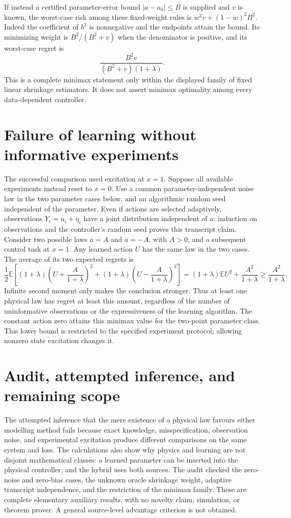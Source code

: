 \documentclass[11pt]{article}
\begin{document}
If instead a certified parameter-error bound $|a-a_0|\le B$
is supplied and $v$ is known, the worst-case risk among these
fixed-weight rules is
$w^2v+(1-w)^2B^2$. Indeed the coefficient of $b^2$ is
nonnegative and the endpoints attain the bound. Its minimizing
weight is $B^2/(B^2+v)$ when the denominator is positive,
and its worst-case regret is
\[
 \frac{B^2v}{(B^2+v)(1+\lambda)}.
\]
This is a complete minimax statement only within the displayed
family of fixed linear shrinkage estimators. It does not assert
minimax optimality among every data-dependent controller.

\section{Failure of learning without informative experiments}
The successful comparison used excitation at $x=1$. Suppose
all available experiments instead reset to $x=0$. Use a common
parameter-independent noise law in the two parameter cases below,
and an algorithmic random seed independent of the parameter.
Even if actions are selected adaptively, observations $Y_i=u_i+\eta_i$ have a
joint distribution independent of $a$: induction on observations
and the controller's random seed proves this transcript claim.
Consider two possible laws $a=A$ and $a=-A$, with $A>0$, and a
subsequent control task at $x=1$. Any learned action $U$ has the
same law in the two cases. The average of its two expected
regrets is
\[
 \frac12\mathbb E\left[(1+\lambda)
 \left(U+\frac{A}{1+\lambda}\right)^2
 +(1+\lambda)\left(U-\frac{A}{1+\lambda}\right)^2\right]
 =(1+\lambda)\mathbb E U^2+\frac{A^2}{1+\lambda}
 \ge\frac{A^2}{1+\lambda}.
\]
Infinite second moment only makes the conclusion stronger.
Thus at least one physical law has regret at least this amount,
regardless of the number of uninformative observations or the
expressiveness of the learning algorithm. The constant action
zero attains this minimax value for the two-point parameter class.
This lower bound is restricted to the specified experiment
protocol; allowing nonzero state excitation changes it.

\section{Audit, attempted inference, and remaining scope}
The attempted inference that the mere existence of a physical law
favours either modelling method fails because exact knowledge,
misspecification, observation noise, and experimental excitation
produce different comparisons on the same system and loss.
The calculations also show why physics and learning are not
disjoint mathematical classes: a learned parameter can be inserted
into the physical controller, and the hybrid uses both sources.
The audit checked the zero-noise and zero-bias cases, the unknown
oracle shrinkage weight, adaptive transcript independence, and the
restriction of the minimax family. These are complete elementary
auxiliary results, with no novelty claim, simulation, or theorem
prover. A general source-level advantage criterion is not obtained.
\end{document}
